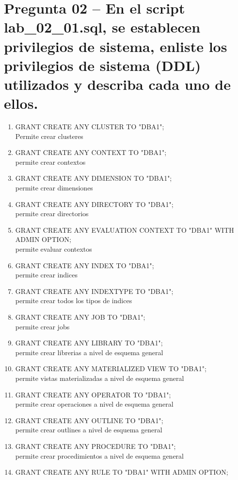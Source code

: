 \section{Pregunta 02 – En el script lab\_02\_01.sql, se establecen privilegios de sistema, enliste los privilegios de sistema (DDL) utilizados y describa cada uno de ellos. } 


\begin{enumerate}
\item GRANT CREATE ANY CLUSTER TO "DBA1";
\\ Permite crear clusteres
\item GRANT CREATE ANY CONTEXT TO "DBA1";
\\  permite crear contextos
\item GRANT CREATE ANY DIMENSION TO "DBA1";
\\  permite  crear dimensiones
\item GRANT CREATE ANY DIRECTORY TO "DBA1";
\\  permite crear directorios
\item GRANT CREATE ANY EVALUATION CONTEXT TO "DBA1" WITH ADMIN OPTION;
\\  permite evaluar contextos
\item GRANT CREATE ANY INDEX TO "DBA1";
\\  permite crear indices
\item GRANT CREATE ANY INDEXTYPE TO "DBA1";
\\  permite crear todos los tipos de indices
\item GRANT CREATE ANY JOB TO "DBA1";
\\  permite crear jobs
\item GRANT CREATE ANY LIBRARY TO "DBA1";
\\  permite crear librerias a nivel de esquema general
\item GRANT CREATE ANY MATERIALIZED VIEW TO "DBA1";
\\  permite vistas materializadas a nivel de esquema general
\item GRANT CREATE ANY OPERATOR TO "DBA1";
\\  permite crear operaciones a nivel de esquema general
\item GRANT CREATE ANY OUTLINE TO "DBA1";
\\  permite crear outlines a nivel de esquema general
\item GRANT CREATE ANY PROCEDURE TO "DBA1";
\\  permite crear procedimientos a nivel de esquema general
\item GRANT CREATE ANY RULE TO "DBA1" WITH ADMIN OPTION;

\end{enumerate}
